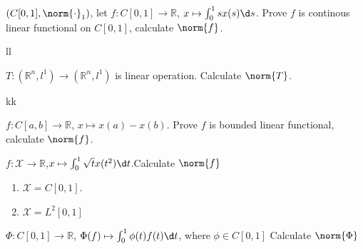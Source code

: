 \documentclass{ctexart}
\newif\ifpreface
\begin{document}
\large
\setlength{\baselineskip}{1.2em}
\ifpreface
    
\else
\maketitle
\fi
{}
\begin{problem}
    $(C[0,1],\norm{\cdot}_1)$, let $f:C[0,1]\to \mathbb{R}$, $x\mapsto\int_0^1sx(s)\d s$. Prove $f$ is continous linear functional on $C[0,1]$, calculate $\norm{f}$.
\end{problem}
\begin{solution}
    ll
\end{solution}

\begin{problem}
    $T:(\mathbb{R}^n,l^1)\to (\mathbb{R}^n,l^1)$ is linear operation. Calculate $\norm{T}$.
\end{problem}
\begin{solution}
    kk
\end{solution}

\begin{problem}
    $f: C[a,b]\to \mathbb{R}$, $x\mapsto x(a)-x(b)$. Prove $f$ is bounded linear functional, calculate $\norm{f}$.
\end{problem}

\begin{problem}
    $f: \mathcal{X}\to \mathbb{R}$,$x\mapsto\int_0^1\sqrt{t} x(t^2)\d t$.Calculate $\norm{f}$
    \begin{enumerate}
        \item $\mathcal{X}=C[0,1]$.
        \item $\mathcal{X}=L^2[0,1]$
    \end{enumerate}
\end{problem}

\begin{problem}
    $\Phi: C[0,1]\to \mathbb{R}$, $\Phi(f)\mapsto \int_0^1\phi(t)f(t)\d t$, where $\phi\in C[0,1]$ Calculate $\norm{\Phi}$
\end{problem}
\end{document}
